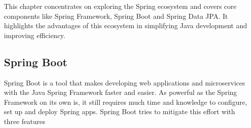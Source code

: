 \Author{\daAuthorThree}
    This chapter concentrates on exploring the Spring ecosystem and covers core components like Spring Framework, Spring Boot and Spring Data JPA. It highlights the advantages of this ecosystem in simplifying Java development and improving efficiency.

    \subsection{Spring Boot}
    Spring Boot is a tool that makes developing web applications and microservices with the Java Spring Framework faster and easier. As powerful as the Spring Framework on its own is, it still requires much time and knowledge to configure, set up and deploy Spring apps. Spring Boot tries to mitigate this effort with three features 

